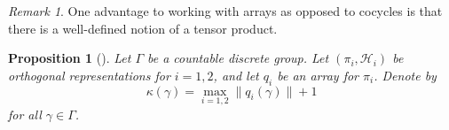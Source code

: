 \documentclass[a4paper,11pt]{article}
\numberwithin{equation}{section}
\newtheorem{prop}[thm]{Proposition}
\theoremstyle{definition}
\theoremstyle{remark}
\newtheorem{rem}[thm]{Remark}
\numberwithin{equation}{section}
\def\H{\mathcal H}
\providecommand{\norm}[1]{\lVert#1\rVert}
\numberwithin{equation}{section}
\begin{document}
\begin{rem}
  One advantage to working with arrays as opposed to cocycles is that there is a well-defined notion of a tensor product.
\end{rem}

\begin{prop}[\textcite{chifan:13}]
  Let $ \Gamma $ be a countable discrete group. Let $ (\pi_{i},\H_{i}) $ be orthogonal representations for $ i=1,2 $, and let $ q_{i} $ be an array for $ \pi_{i} $. Denote by
  \[
    \kappa(\gamma) = \max_{i=1,2} \norm{q_{i}(\gamma)} + 1
  \]
  for all $ \gamma\in \Gamma $. 
\end{prop}



\printbibliography
\end{document}
